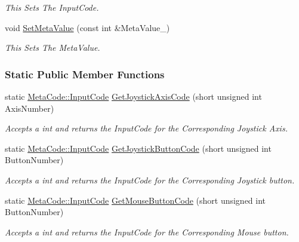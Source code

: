 \begin{DoxyCompactItemize}
\begin{DoxyCompactList}\small\item\em This Sets The InputCode. \item\end{DoxyCompactList}\item 
void \hyperlink{classMezzanine_1_1MetaCode_a6a98dad161c7e45a3f9154b2864db47b}{SetMetaValue} (const int \&MetaValue\_\-)
\begin{DoxyCompactList}\small\item\em This Sets The MetaValue. \item\end{DoxyCompactList}\end{DoxyCompactItemize}
\subsubsection*{Static Public Member Functions}
\begin{DoxyCompactItemize}
\item 
static \hyperlink{classMezzanine_1_1MetaCode_a3b5633f0145bf3287cf53a3f05b5563c}{MetaCode::InputCode} \hyperlink{classMezzanine_1_1MetaCode_ab8b87a3816659517a8307d510189f8f7}{GetJoystickAxisCode} (short unsigned int AxisNumber)
\begin{DoxyCompactList}\small\item\em Accepts a int and returns the InputCode for the Corresponding Joystick Axis. \item\end{DoxyCompactList}\item 
static \hyperlink{classMezzanine_1_1MetaCode_a3b5633f0145bf3287cf53a3f05b5563c}{MetaCode::InputCode} \hyperlink{classMezzanine_1_1MetaCode_aedfc7351865f96d3d354fcbfeb4e1fc1}{GetJoystickButtonCode} (short unsigned int ButtonNumber)
\begin{DoxyCompactList}\small\item\em Accepts a int and returns the InputCode for the Corresponding Joystick button. \item\end{DoxyCompactList}\item 
static \hyperlink{classMezzanine_1_1MetaCode_a3b5633f0145bf3287cf53a3f05b5563c}{MetaCode::InputCode} \hyperlink{classMezzanine_1_1MetaCode_af818525aa7815c16a7e82f7e432a321e}{GetMouseButtonCode} (short unsigned int ButtonNumber)
\begin{DoxyCompactList}\small\item\em Accepts a int and returns the InputCode for the Corresponding Mouse button. \item\end{DoxyCompactList}\end{DoxyCompactItemize}


